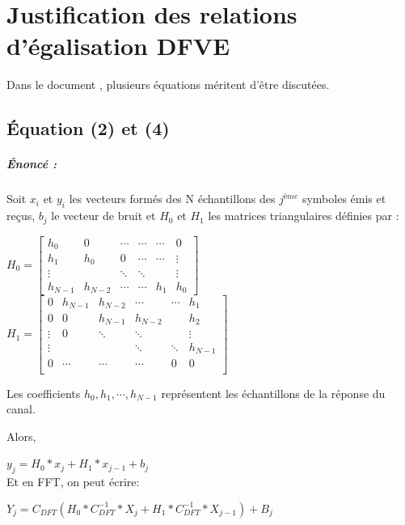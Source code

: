 
\chapter{Justification des relations d'égalisation DFVE}

Dans le document \cite{sujet}, plusieurs équations méritent d'être discutées.

\section{Équation (2) et (4)}
\label{sec:24}

\paragraph{Énoncé :}

Soit $x_i$ et $y_i$ les vecteurs formés des N échantillons des $j^{ème}$
symboles émis et reçus, $b_j$ le vecteur de bruit et $H_0$ et $H_1$ les matrices
triangulaires définies par :

$H_0=
\begin{bmatrix}
  h_0 & 0 & \cdots & \cdots & \cdots & 0 \\
  h_1 & h_0 & 0 & \cdots  & \cdots & \vdots \\
  \vdots & & \ddots & \ddots &  & \vdots \\
  h_{N-1} & h_{N-2} & \cdots & \cdots & h_1 & h_0

\end{bmatrix}
$  $H_1=
\begin{bmatrix}
  0 & h_{N-1} & h_{N-2} & \cdots & \cdots & h_1 \\
  0 & 0 & h_{N-1} & h_{N-2} &  & h_2 \\
  \vdots & 0 & \ddots & \ddots &   & \vdots \\
  \vdots &  &  & \ddots  & \ddots & h_{N-1} \\
  0 & \cdots & \cdots & \cdots & 0 & 0 \\


\end{bmatrix}
$

Les coefficients $h_0,h_1,\cdots,h_{N-1}$ représentent les échantillons de la
réponse du canal.

Alors,

$ y_j = H_0*x_j+H_1*x_{j-1}+b_j$
~\\

Et en FFT, on peut écrire:

$ Y_j = C_{DFT}(H_0*C_{DFT}^{-1}*X_j + H_1*C_{DFT}^{-1}*X_{j-1}) + B_j$

